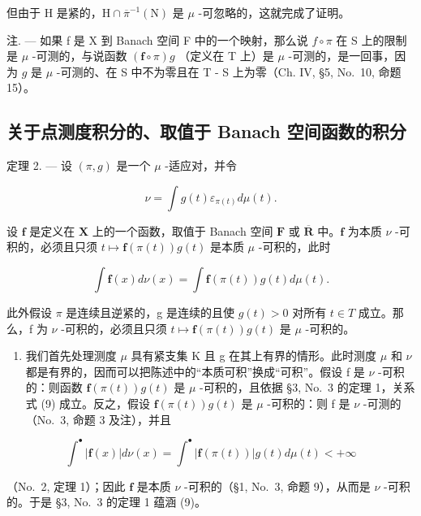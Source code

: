 但由于 H 是紧的，\(\mathrm{H} \cap \overline{\pi}^{-1}(\mathrm{N})\) 是 \(\mu\) -可忽略的，这就完成了证明。

注. --- 如果 f 是 X 到 Banach 空间 F 中的一个映射，那么说 \(f \circ \pi\) 在 S 上的限制是 \(\mu\) -可测的，与说函数 \((\mathbf{f} \circ \pi)g\) （定义在 T 上）是 \(\mu\) -可测的，是一回事，因为 \(g\) 是 \(\mu\) -可测的、在 S 中不为零且在 T - S 上为零（Ch. IV, §5, No.~10, 命题 15）。

\subsection{关于点测度积分的、取值于 Banach 空间函数的积分}

定理 2. --- 设 \((\pi, g)\) 是一个 \(\mu\) -适应对，并令

\[
\nu = \int g (t) \varepsilon_ {\pi (t)} d \mu (t).
\]

设 \(\mathbf{f}\) 是定义在 \(\mathbf{X}\) 上的一个函数，取值于 Banach 空间 \(\mathbf{F}\) 或 \(\overline{\mathbf{R}}\) 中。\(\mathbf{f}\) 为本质 \(\nu\) -可积的，必须且只须 \(t \mapsto \mathbf{f}(\pi(t))g(t)\) 是本质 \(\mu\) -可积的，此时

\[
\int \mathbf {f} (x) d \nu (x) = \int \mathbf {f} (\pi (t)) g (t) d \mu (t).\tag{9}
\]

此外假设 \(\pi\) 是连续且逆紧的，g 是连续的且使 \(g(t) > 0\) 对所有 \(t \in T\) 成立。那么，f 为 \(\nu\) -可积的，必须且只须 \(t \mapsto \mathbf{f}(\pi(t))g(t)\) 是 \(\mu\) -可积的。

\begin{enumerate}
\def\labelenumi{\Alph{enumi})}
\tightlist
\item
  我们首先处理测度 \(\mu\) 具有紧支集 K 且 g 在其上有界的情形。此时测度 \(\mu\) 和 \(\nu\) 都是有界的，因而可以把陈述中的“本质可积”换成“可积”。假设 f 是 \(\nu\) -可积的：则函数 \(\mathbf{f}(\pi(t))g(t)\) 是 \(\mu\) -可积的，且依据 §3, No.~3 的定理 1，关系式 (9) 成立。反之，假设 \(\mathbf{f}(\pi(t))g(t)\) 是 \(\mu\) -可积的：则 f 是 \(\nu\) -可测的（No.~3, 命题 3 及注），并且
\end{enumerate}

\[
\int^ {\bullet} | \mathbf {f} (x) | d \nu (x) = \int^ {\bullet} | \mathbf {f} (\pi (t)) | g (t) d \mu (t) <   + \infty
\]

（No.~2, 定理 1）；因此 \(\mathbf{f}\) 是本质 \(\nu\) -可积的（§1, No.~3, 命题 9），从而是 \(\nu\) -可积的。于是 §3, No.~3 的定理 1 蕴涵 (9)。

